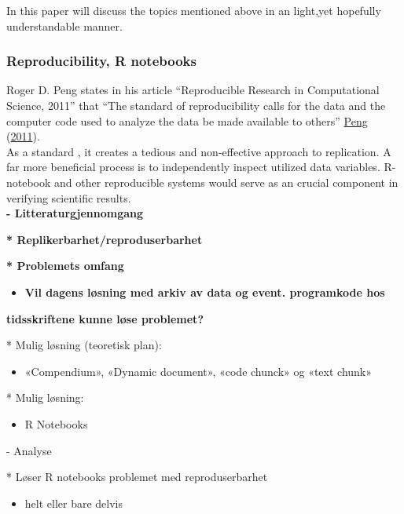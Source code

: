 \documentclass[
  12pt,
  norsk,
]{article}
\providecommand{\tightlist}{%
  \setlength{\itemsep}{0pt}\setlength{\parskip}{0pt}}
\begin{document}
In this paper will discuss the topics mentioned above in an light,yet
hopefully understandable manner.

\hypertarget{reproducibility-r-notebooks}{%
\subsubsection{Reproducibility, R
notebooks}\label{reproducibility-r-notebooks}}

Roger D. Peng states in his article ``Reproducible Research in
Computational Science, 2011'' that ``The standard of reproducibility
calls for the data and the computer code used to analyze the data be
made available to others'' \protect\hyperlink{ref-peng2011}{Peng}
(\protect\hyperlink{ref-peng2011}{2011}).\\
As a standard , it creates a tedious and non-effective approach to
replication. A far more beneficial process is to independently inspect
utilized data variables. R-notebook and other reproducible systems would
serve as an crucial component in verifying scientific results.\\

\textbf{- Litteraturgjennomgang}

\textbf{* Replikerbarhet/reproduserbarhet}

\textbf{* Problemets omfang}

\begin{itemize}
\tightlist
\item
  \textbf{Vil dagens løsning med arkiv av data og event. programkode
  hos}
\end{itemize}

\textbf{tidsskriftene kunne løse problemet?}

* Mulig løsning (teoretisk plan):

\begin{itemize}
\tightlist
\item
  «Compendium», «Dynamic document», «code chunck» og «text chunk»
\end{itemize}

* Mulig løsning:

\begin{itemize}
\tightlist
\item
  R Notebooks
\end{itemize}

- Analyse

* Løser R notebooks problemet med reproduserbarhet

\begin{itemize}
\tightlist
\item
  helt eller bare delvis
\end{itemize}
\end{document}
